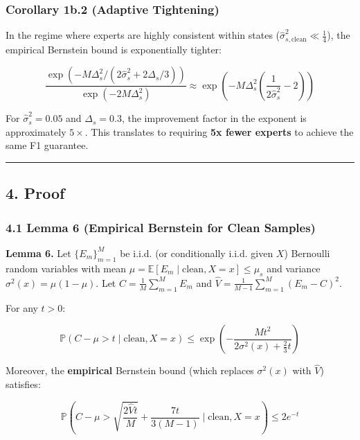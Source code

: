 \documentclass[
  12pt,
]{ctexart}
\begin{document}
\subsubsection{Corollary 1b.2 (Adaptive
Tightening)}\label{corollary-1b.2-adaptive-tightening}

In the regime where experts are highly consistent within states
(\(\hat{\sigma}_{s,\text{clean}}^2 \ll \frac{1}{4}\)), the empirical
Bernstein bound is exponentially tighter:

\[\frac{\exp(-M\Delta_s^2 / (2\hat{\sigma}_s^2 + 2\Delta_s/3))}{\exp(-2M\Delta_s^2)} \approx \exp\!\left(-M\Delta_s^2 \left(\frac{1}{2\hat{\sigma}_s^2} - 2\right)\right)\]

For \(\hat{\sigma}_s^2 = 0.05\) and \(\Delta_s = 0.3\), the improvement
factor in the exponent is approximately \(5\times\). This translates to
requiring \textbf{5x fewer experts} to achieve the same F1 guarantee.

\begin{center}\rule{0.5\linewidth}{0.5pt}\end{center}

\subsection{4. Proof}\label{proof}

\subsubsection{4.1 Lemma 6 (Empirical Bernstein for Clean
Samples)}\label{lemma-6-empirical-bernstein-for-clean-samples}

\textbf{Lemma 6.} Let \(\{E_m\}_{m=1}^M\) be i.i.d. (or conditionally
i.i.d. given \(X\)) Bernoulli random variables with mean
\(\mu = \mathbb{E}[E_m \mid \text{clean}, X = x] \leq \mu_s\) and
variance \(\sigma^2(x) = \mu(1-\mu)\). Let
\(C = \frac{1}{M}\sum_{m=1}^M E_m\) and
\(\hat{V} = \frac{1}{M-1}\sum_{m=1}^M (E_m - C)^2\).

For any \(t > 0\):

\[\mathbb{P}\!\left(C - \mu > t \;\Big|\; \text{clean}, X = x\right) \leq \exp\!\left(-\frac{M t^2}{2\sigma^2(x) + \frac{2}{3}t}\right)\]

Moreover, the \textbf{empirical} Bernstein bound (which replaces
\(\sigma^2(x)\) with \(\hat{V}\)) satisfies:

\[\mathbb{P}\!\left(C - \mu > \sqrt{\frac{2\hat{V} t}{M}} + \frac{7t}{3(M-1)} \;\Big|\; \text{clean}, X = x\right) \leq 2e^{-t}\]
\end{document}
